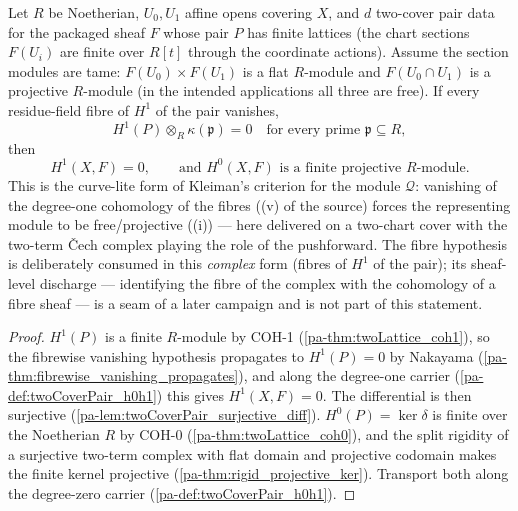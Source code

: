 \begin{theorem}
  \label{pa-thm:twoCoverPair_rigidEngine}
  \leanok

  Let \(R\) be Noetherian, \(U_0, U_1\) affine opens covering \(X\), and \(d\)
  two-cover pair data for the packaged sheaf \(F\) whose pair \(P\) has finite lattices
  (the chart sections \(F(U_i)\) are finite over \(R[t]\) through the coordinate
  actions). Assume the section modules are tame: \(F(U_0) \times F(U_1)\) is a flat
  \(R\)-module and \(F(U_0 \cap U_1)\) is a projective \(R\)-module (in the intended
  applications all three are free). If every residue-field fibre of \(H^1\) of the pair
  vanishes,
  \[
    H^1(P) \otimes_R \kappa(\mathfrak p) = 0 \quad \text{for every prime }
      \mathfrak p \subseteq R,
  \]
  then
  \[
    H^1(X, F) = 0, \qquad \text{and } H^0(X, F) \text{ is a finite projective }
      R\text{-module}.
  \]
  This is the curve-lite form of Kleiman's criterion for the module \(\mathcal Q\):
  vanishing of the degree-one cohomology of the fibres ((v) of the source) forces the
  representing module to be free/projective ((i)) --- here delivered on a two-chart
  cover with the two-term \v Cech complex playing the role of the pushforward. The
  fibre hypothesis is deliberately consumed in this \emph{complex} form (fibres of
  \(H^1\) of the pair); its sheaf-level discharge --- identifying the fibre of the
  complex with the cohomology of a fibre sheaf --- is a seam of a later campaign and is
  not part of this statement.
\end{theorem}
\begin{proof}
  \leanok
  \(H^1(P)\) is a finite \(R\)-module by COH-1 (\ref{pa-thm:twoLattice_coh1}), so the
  fibrewise vanishing hypothesis propagates to \(H^1(P) = 0\) by Nakayama
  (\ref{pa-thm:fibrewise_vanishing_propagates}), and along the degree-one carrier
  (\ref{pa-def:twoCoverPair_h0h1}) this gives \(H^1(X, F) = 0\). The differential is then
  surjective (\ref{pa-lem:twoCoverPair_surjective_diff}). \(H^0(P) = \ker\delta\) is
  finite over the Noetherian \(R\) by COH-0 (\ref{pa-thm:twoLattice_coh0}), and the split
  rigidity of a surjective two-term complex with flat domain and projective codomain
  makes the finite kernel projective (\ref{pa-thm:rigid_projective_ker}). Transport both
  along the degree-zero carrier (\ref{pa-def:twoCoverPair_h0h1}).
\end{proof}

